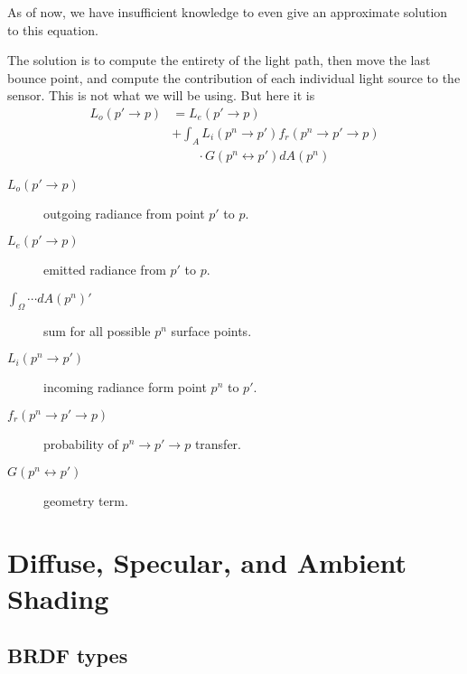 \documentclass[10pt]{armath}
\numberwithin{equation}{section}
\theoremstyle{definition}
\newcommand{\ra}{\rightarrow}
\newcommand{\lra}{\leftrightarrow}
\begin{document}
\begin{multicols}{2}
As of now, we have insufficient knowledge to even give an approximate solution
to this equation.

The solution is to compute the entirety of the light path, then move the last
bounce point, and compute the contribution of each individual light source to
the sensor. This is not what we will be using. But here it is
\begin{align*}
   L_o\left(p'\ra p\right)&=L_e\left(p'\ra p\right)\\&+\int_AL_i\left(p^n\ra
       p'\right)f_r\left(p^n\ra p'\ra p\right)\\&\quad\quad\cdot G\left(p^n\lra
       p'\right)dA\left(p^n\right)
\end{align*}
\begin{description}
  \item[$L_o\left(p'\ra p\right)$] outgoing radiance from point $p'$ to $p$.
  \item[$L_e\left(p'\ra p\right)$] emitted radiance from $p'$ to $p$.
  \item[$\int_\Omega\cdots dA\left(p^n\right)'$] sum for all possible $p^n$
    surface points.
  \item[$L_i\left(p^n\ra p'\right)$] incoming radiance form point $p^n$ to
    $p'$.
  \item[$f_r\left(p^n\ra p'\ra p\right)$] probability of $p^n\ra p'\ra p$
    transfer.
  \item[$G\left(p^n\lra p'\right)$] geometry term.
\end{description}

\section{Diffuse, Specular, and Ambient Shading}%
\label{sec:diffuse_specular_and_ambient_shading}

\subsection{BRDF types}%
\label{sub:brdf_types}



\end{multicols}
\end{document}
